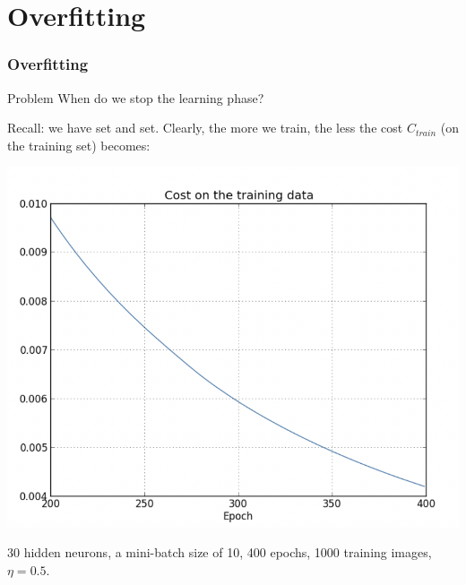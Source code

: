\documentclass[usenames,dvipsnames]{beamer}
\begin{document}
\section{Overfitting}

\begin{frame}
	\frametitle{Overfitting}
	
	\begin{alertblock}{Problem}
		When do we stop the learning phase?
	\end{alertblock}
	
	\pause
	
	Recall: we have  set and  set. Clearly, the more we train, the less the cost $C_{train}$ (on the training set) becomes:

\begin{center}
\includegraphics[scale=.3]{cost-train}
\end{center}

{\tiny 30 hidden neurons, a mini-batch size of 10, 400 epochs, 1000 training images, $\eta=0.5$.}
	
\end{frame}
\end{document}
